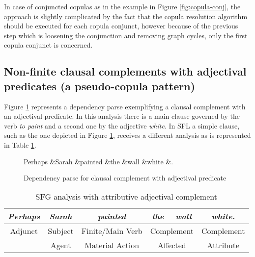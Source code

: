     In case of conjuncted copulas as in the example in Figure \ref{fig:copula-conj}, the approach is slightly complicated by the fact that the copula resolution algorithm should be executed for each copula conjunct, however because of the previous step which is loosening the conjunction and removing graph cycles, only the first copula conjunct is concerned.

\subsection{Non-finite clausal complements with adjectival predicates (a pseudo-copula pattern)}
\label{sec:nonfinite-clausal-complement}
    Figure \ref{fig:clausal-complement-jj} represents a dependency parse exemplifying a clausal complement with an adjectival predicate. In this analysis there is a main clause governed by the verb \textit{to paint} and a second one by the adjective \textit{white}. In SFL a simple clause, such as the one depicted in Figure \ref{fig:clausal-complement-jj}, receives a different analysis as is represented in Table \ref{tab:adjectival-complement}.

    \begin{figure}[!ht]
    	\centering
    	\begin{dependency}
    		\begin{deptext}[]
    			Perhaps \&Sarah \&painted \&the \&wall \&white \&. \\
    		\end{deptext}
    	\end{dependency}
    	\caption{Dependency parse for clausal complement with adjectival predicate}
    	\label{fig:clausal-complement-jj}
    \end{figure} 

    \begin{table}[!ht]
    	\centering
    	\begin{tabular}{|c|c|c|c|c|c|}
    		\hline
    		\textit{Perhaps} & \textit{Sarah} & \textit{painted} & \textit{the}   & \textit{wall}  & \textit{white.} \\ \hline
    		Adjunct          & Subject        & Finite/Main Verb & \multicolumn{2}{c|}{Complement} & Complement      \\ \hline
    		& Agent          & Material Action  & \multicolumn{2}{c|}{Affected}   & Attribute       \\ \hline
    	\end{tabular}
    	\caption{SFG analysis with attributive adjectival complement}
    	\label{tab:adjectival-complement}
\end{table}

